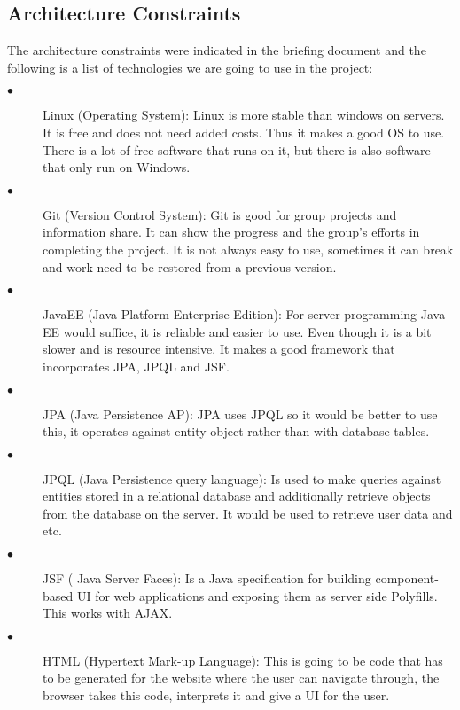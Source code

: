 \documentclass[12pt]{article}
\begin{document}
\subsection{Architecture Constraints}

The architecture constraints were indicated in the briefing document and the following is a list of technologies we are going to use in the project:

\begin{description}
  \item[$\bullet$] Linux (Operating System):
  Linux is more stable than windows on servers. It is free and does not need added costs. Thus it makes a good OS to use. There is a lot of free software that runs on it, but there is also software that only run on Windows. 
  
  \item[$\bullet$] Git (Version Control System):
  Git is good for group projects and information share. It can show the progress and the group’s efforts in completing the project. It is not always easy to use, sometimes it can break and work need to be restored from a previous version.
  
  \item[$\bullet$] JavaEE (Java Platform Enterprise Edition):
  For server programming Java EE would suffice, it is reliable and easier to use. Even though it is a bit slower and is resource intensive. It makes a good framework that incorporates JPA,  JPQL and JSF.
  
  \item[$\bullet$]JPA (Java Persistence AP):
  JPA uses JPQL so it would be better to use this, it operates against entity object rather than with database tables.
  
  \item[$\bullet$] JPQL (Java Persistence query language):
  Is used to make queries against entities stored in a relational database and additionally retrieve objects from the database on the server. It would be used to retrieve user data and etc. 
  
  \item[$\bullet$] JSF ( Java Server Faces):
  Is a Java specification for building component-based UI for web applications and exposing them as server side Polyfills. This works with AJAX. 
  
  \item[$\bullet$] HTML (Hypertext Mark-up Language):
  This is going to be code that has to be generated for the website where the user can navigate through, the browser takes this code, interprets it and give a UI for the user. 
  

\end{description}
\end{document}
